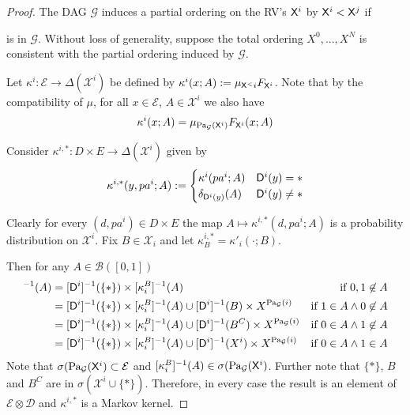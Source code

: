 \begin{proof}
The DAG $\mathcal{G}$ induces a partial ordering on the RV's $\mathsf{X}^i$ by $\mathsf{X}^i < \mathsf{X}^j$ if  is in $\mathcal{G}$. Without loss of generality, suppose the total ordering $X^0,...,X^N$ is consistent with the partial ordering induced by $\mathcal{G}$.

Let $\kappa^i: \mathcal{E}\to \Delta(\mathcal{X}^i)$ be defined by $\kappa^i(x;A) := \mu_{\mathsf{X}^<i} F_{\mathsf{X}^i}$. Note that by the compatibility of $\mu$, for all $x\in \mathcal{E}$, $A\in \mathcal{X}^i$ we also have
\begin{align}
    \kappa^i(x;A) = \mu_{\text{Pa}_{\mathcal{G}}(\mathsf{X}^i)} F_{\mathsf{X}^i} (x;A) \label{eq: compatibilty}
\end{align}

Consider $\kappa^{i,*}:D\times E \to \Delta(\mathcal{X}^i)$ given by \begin{align}
    \kappa^{i,*}(y,pa^i;A) := \begin{cases}\kappa^i(pa^i;A) &\mathsf{D}^i(y) = * \\
    \delta_{\mathsf{D}^i(y)}(A) & \mathsf{D}^i(y) \neq *\end{cases}\label{eq:passive}
\end{align}

Clearly for every $(d,pa^i) \in D\times E$ the map $A\mapsto \kappa^{i,*}(d,pa^i;A)$ is a probability distribution on $\mathcal{X}^i$. Fix $B\in\mathcal{X}_i$ and let $\kappa^{i,*}_B=\kappa'_i(\cdot;B)$.

Then for any $A\in \mathcal{B}([0,1])$
\begin{align}
    [\kappa^{i,*}_B]^{-1}(A) &= [\RV{D}^i]^{-1}(\{*\})\times[\kappa^B_i]^{-1}(A) &\text{if }0,1\not\in A\\
    &= [\RV{D}^i]^{-1}(\{*\})\times[\kappa^B_i]^{-1}(A)\cup [\RV{D}^i]^{-1}(B)\times X^{\PA{\mathcal{G}}{i}} &\text{if }1\in A\land 0\not\in A\\
    &= [\RV{D}^i]^{-1}(\{*\})\times[\kappa^B_i]^{-1}(A)\cup [\RV{D}^i]^{-1}(B^C)\times X^{\PA{\mathcal{G}}{i}} &\text{if }0\in A\land 1\not\in A\\
    &= [\RV{D}^i]^{-1}(\{*\})\times[\kappa^B_i]^{-1}(A)\cup [\RV{D}^i]^{-1}(X^i)\times X^{\PA{\mathcal{G}}{i}} &\text{if }0\in A\land 1\in A
\end{align}
Note that $\sigma(\text{Pa}_{\mathcal{G}}(\mathsf{X}^i)\subset\mathcal{E}$ and $[\kappa^B_i]^{-1}(A)\in \sigma(\text{Pa}_{\mathcal{G}}(\mathsf{X}^i)$. Further note that $\{*\}$, $B$ and $B^C$ are in $\sigma(\mathcal{X}^i\cup\{*\})$. Therefore, in every case the result is  an element of $\mathcal{E}\otimes\mathcal{D}$ and $\kappa^{i,*}$ is a Markov kernel.


\end{proof}
